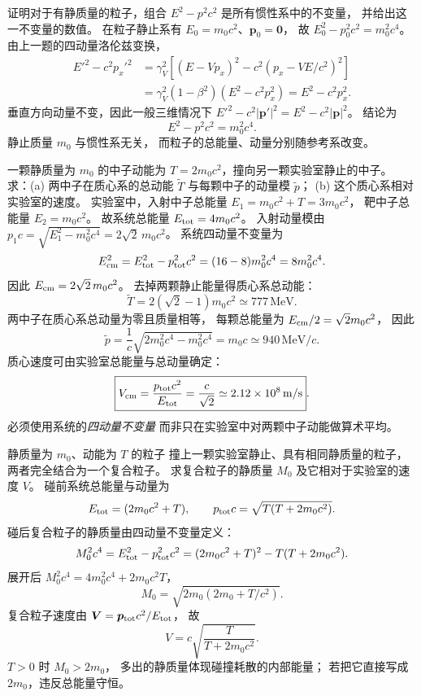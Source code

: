 证明对于有静质量的粒子，组合
$E^2-p^2c^2$ 是所有惯性系中的不变量，
并给出这一不变量的数值。
\exsolution
在粒子静止系有
$E_0=m_0c^2$、$\bm p_0=\bm0$，
故
$E_0^2-p_0^2c^2=m_0^2c^4$。
由上一题的四动量洛伦兹变换，
\[
\begin{aligned}
E'^2-c^2p_x'^2
&=\gamma_V^2[(E-Vp_x)^2-
c^2(p_x-VE/c^2)^2]\\
&=\gamma_V^2(1-\beta^2)(E^2-c^2p_x^2)
=E^2-c^2p_x^2.
\end{aligned}
\]
垂直方向动量不变，因此一般三维情况下
$E'^2-c^2|\bm p'|^2=E^2-c^2|\bm p|^2$。
结论为
\[
\boxed{E^2-p^2c^2=m_0^2c^4}.
\]
\excheck 静止质量 $m_0$ 与惯性系无关，
而粒子的总能量、动量分别随参考系改变。

一颗静质量为 $m_0$ 的中子动能为
$T=2m_0c^2$，撞向另一颗实验室静止的中子。
求：(a) 两中子在质心系的总动能
$\widetilde T$ 与每颗中子的动量模
$\widetilde p$；
(b) 这个质心系相对实验室的速度。
\exsolution
实验室中，入射中子总能量
$E_1=m_0c^2+T=3m_0c^2$，
靶中子总能量 $E_2=m_0c^2$。
故系统总能量
$E_{\rm tot}=4m_0c^2$。
入射动量模由
$p_1c=\sqrt{E_1^2-m_0^2c^4}
=2\sqrt2\,m_0c^2$。
系统四动量不变量为
\[
E_{\rm cm}^2
=E_{\rm tot}^2-p_{\rm tot}^2c^2
=(16-8)m_0^2c^4=8m_0^2c^4.
\]
因此
$E_{\rm cm}=2\sqrt2\,m_0c^2$。
去掉两颗静止能量得质心系总动能：
\[
\boxed{\widetilde T
=2(\sqrt2-1)m_0c^2
\simeq777\,\mathrm{MeV}}.
\]
两中子在质心系总动量为零且质量相等，
每颗总能量为
$E_{\rm cm}/2=\sqrt2 m_0c^2$，
因此
\[
\boxed{\widetilde p=
\frac1c\sqrt{2m_0^2c^4-m_0^2c^4}
=m_0c\simeq940\,\mathrm{MeV}/c}.
\]
质心速度可由实验室总能量与总动量确定：
\[
\boxed{V_{\rm cm}
=\frac{p_{\rm tot}c^2}{E_{\rm tot}}
=\frac{c}{\sqrt2}
\simeq2.12\times10^8\,\mathrm{m/s}}.
\]
\excheck 必须使用系统的\emph{四动量不变量}
而非只在实验室中对两颗中子动能做算术平均。

静质量为 $m_0$、动能为 $T$ 的粒子
撞上一颗实验室静止、具有相同静质量的粒子，
两者完全结合为一个复合粒子。
求复合粒子的静质量 $M_0$
及它相对于实验室的速度 $V$。
\exsolution
碰前系统总能量与动量为
\[
E_{\rm tot}=(2m_0c^2+T),\qquad
p_{\rm tot}c=\sqrt{T(T+2m_0c^2)}.
\]
碰后复合粒子的静质量由四动量不变量定义：
\[
M_0^2c^4=E_{\rm tot}^2-p_{\rm tot}^2c^2
=(2m_0c^2+T)^2-T(T+2m_0c^2).
\]
展开后
$M_0^2c^4=4m_0^2c^4+2m_0c^2T$，
\[
\boxed{M_0=\sqrt{2m_0(2m_0+T/c^2)}}.
\]
复合粒子速度由
$\bm V=\bm p_{\rm tot}c^2/E_{\rm tot}$，
故
\[
\boxed{V=c\sqrt{\frac{T}{T+2m_0c^2}}}.
\]
\excheck $T>0$ 时 $M_0>2m_0$，
多出的静质量体现碰撞耗散的内部能量；
若把它直接写成 $2m_0$，违反总能量守恒。

